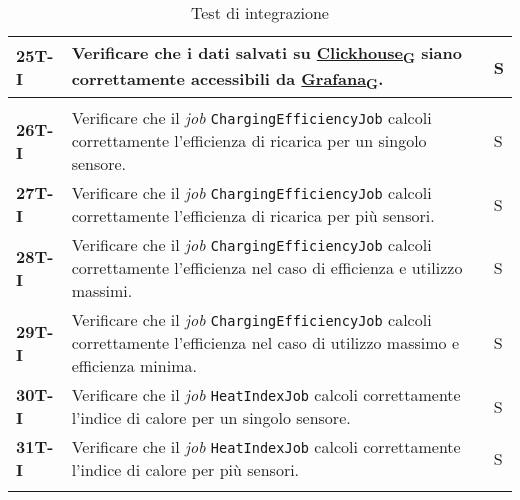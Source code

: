 \begin{longtable}{|>{\raggedright\arraybackslash}m{}|>{\raggedright\arraybackslash}m{}|>{\raggedright\arraybackslash}m{}|}
	\hline
	\textbf{25T-I}  & Verificare che i dati salvati su \href{https://7last.github.io/docs/rtb/documentazione-interna/glossario\#clickhouse}{Clickhouse\textsubscript{G}} siano correttamente accessibili da \href{https://7last.github.io/docs/rtb/documentazione-interna/glossario\#grafana}{Grafana\textsubscript{G}}.                                  & S              \\
	\hline
	\multicolumn{3}{|c|}{\textbf{Apache Flink}} \\
	\hline
	\textbf{26T-I}  & Verificare che il \textit{job} \texttt{ChargingEfficiencyJob} calcoli correttamente l'efficienza di ricarica per un singolo sensore.                                                                                                                                                                                                & S              \\
	\hline
	\textbf{27T-I}  & Verificare che il \textit{job} \texttt{ChargingEfficiencyJob} calcoli correttamente l'efficienza di ricarica per più sensori.                                                                                                                                                                                                       & S              \\
	\hline
	\textbf{28T-I}  & Verificare che il \textit{job} \texttt{ChargingEfficiencyJob} calcoli correttamente l'efficienza nel caso di efficienza e utilizzo massimi.                                                                                                                                                                                         & S              \\
	\hline
	\textbf{29T-I}  & Verificare che il \textit{job} \texttt{ChargingEfficiencyJob} calcoli correttamente l'efficienza nel caso di utilizzo massimo e efficienza minima.                                                                                                                                                                                  & S              \\
	\hline
	\textbf{30T-I}  & Verificare che il \textit{job} \texttt{HeatIndexJob} calcoli correttamente l'indice di calore per un singolo sensore.                                                                                                                                                                                                               & S              \\
	\hline
	\textbf{31T-I}  & Verificare che il \textit{job} \texttt{HeatIndexJob} calcoli correttamente l'indice di calore per più sensori.                                                                                                                                                                                                                      & S              \\
	\hline
	\caption{Test di integrazione}
\end{longtable}

